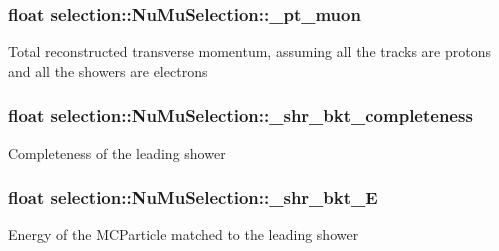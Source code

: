 \subsubsection[{\texorpdfstring{\+\_\+pt\+\_\+muon}{_pt_muon}}]{\setlength{\rightskip}{0pt plus 5cm}float selection\+::\+Nu\+Mu\+Selection\+::\+\_\+pt\+\_\+muon\hspace{0.3cm}{\ttfamily [private]}}\hypertarget{classselection_1_1NuMuSelection_abcba7cd55395fa3ae3822f84abad4d73}{}\label{classselection_1_1NuMuSelection_abcba7cd55395fa3ae3822f84abad4d73}
Total reconstructed transverse momentum, assuming all the tracks are protons and all the showers are electrons 
\subsubsection[{\texorpdfstring{\+\_\+shr\+\_\+bkt\+\_\+completeness}{_shr_bkt_completeness}}]{\setlength{\rightskip}{0pt plus 5cm}float selection\+::\+Nu\+Mu\+Selection\+::\+\_\+shr\+\_\+bkt\+\_\+completeness\hspace{0.3cm}{\ttfamily [private]}}\hypertarget{classselection_1_1NuMuSelection_a18224668e51654b8322757c2db5d8b9d}{}\label{classselection_1_1NuMuSelection_a18224668e51654b8322757c2db5d8b9d}
Completeness of the leading shower 
\subsubsection[{\texorpdfstring{\+\_\+shr\+\_\+bkt\+\_\+E}{_shr_bkt_E}}]{\setlength{\rightskip}{0pt plus 5cm}float selection\+::\+Nu\+Mu\+Selection\+::\+\_\+shr\+\_\+bkt\+\_\+E\hspace{0.3cm}{\ttfamily [private]}}\hypertarget{classselection_1_1NuMuSelection_aa6e475979c9554cb14bf7a082385a128}{}\label{classselection_1_1NuMuSelection_aa6e475979c9554cb14bf7a082385a128}
Energy of the M\+C\+Particle matched to the leading shower 

